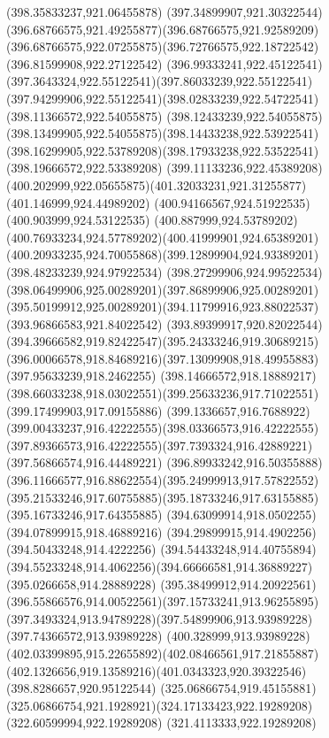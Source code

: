 {{		\lineto(398.35833237,921.06455878)
		\curveto(397.34899907,921.30322544)(396.68766575,921.49255877)(396.68766575,921.92589209)
		\curveto(396.68766575,922.07255875)(396.72766575,922.18722542)(396.81599908,922.27122542)
		\curveto(396.99333241,922.45122541)(397.3643324,922.55122541)(397.86033239,922.55122541)
		\curveto(397.94299906,922.55122541)(398.02833239,922.54722541)(398.11366572,922.54055875)
		\curveto(398.12433239,922.54055875)(398.13499905,922.54055875)(398.14433238,922.53922541)
		\curveto(398.16299905,922.53789208)(398.17933238,922.53522541)(398.19666572,922.53389208)
		\curveto(399.11133236,922.45389208)(400.202999,922.05655875)(401.32033231,921.31255877)
		\lineto(401.146999,924.44989202)
		\lineto(400.94166567,924.51922535)
		\lineto(400.903999,924.53122535)
		\curveto(400.887999,924.53789202)(400.76933234,924.57789202)(400.41999901,924.65389201)
		\curveto(400.20933235,924.70055868)(399.12899904,924.93389201)(398.48233239,924.97922534)
		\curveto(398.27299906,924.99522534)(398.06499906,925.00289201)(397.86899906,925.00289201)
		\curveto(395.50199912,925.00289201)(394.11799916,923.88022537)(393.96866583,921.84022542)
		\curveto(393.89399917,920.82022544)(394.39666582,919.82422547)(395.24333246,919.30689215)
		\curveto(396.00066578,918.84689216)(397.13099908,918.49955883)(397.95633239,918.2462255)
		\lineto(398.14666572,918.18889217)
		\curveto(398.66033238,918.03022551)(399.25633236,917.71022551)(399.17499903,917.09155886)
		\curveto(399.1336657,916.7688922)(399.00433237,916.42222555)(398.03366573,916.42222555)
		\curveto(397.89366573,916.42222555)(397.7393324,916.42889221)(397.56866574,916.44489221)
		\curveto(396.89933242,916.50355888)(396.11666577,916.88622554)(395.24999913,917.57822552)
		\curveto(395.21533246,917.60755885)(395.18733246,917.63155885)(395.16733246,917.64355885)
		\lineto(394.63099914,918.0502255)
		\lineto(394.07899915,918.46889216)
		\lineto(394.29899915,914.4902256)
		\lineto(394.50433248,914.4222256)
		\lineto(394.54433248,914.40755894)
		\curveto(394.55233248,914.4062256)(394.66666581,914.36889227)(395.0266658,914.28889228)
		\curveto(395.38499912,914.20922561)(396.55866576,914.00522561)(397.15733241,913.96255895)
		\curveto(397.3493324,913.94789228)(397.54899906,913.93989228)(397.74366572,913.93989228)
		\curveto(400.328999,913.93989228)(402.03399895,915.22655892)(402.08466561,917.21855887)
		\curveto(402.1326656,919.13589216)(401.0343323,920.39322546)(398.8286657,920.95122544)
		\moveto(325.06866754,919.45155881)
		\curveto(325.06866754,921.1928921)(324.17133423,922.19289208)(322.60599994,922.19289208)
		\lineto(321.4113333,922.19289208)
}}
